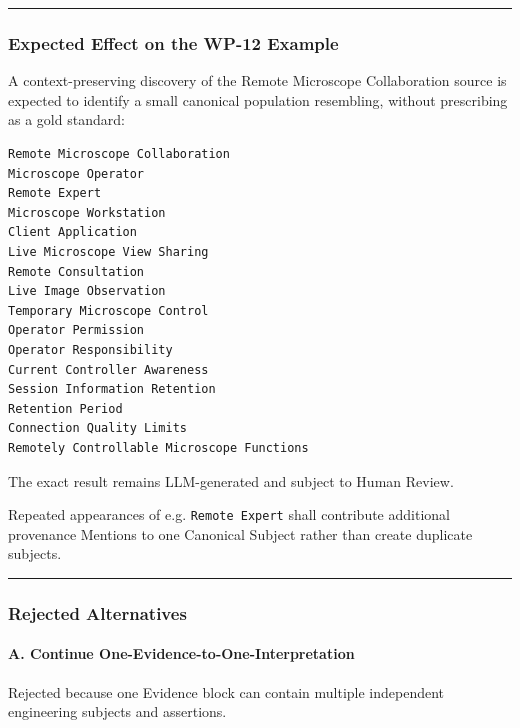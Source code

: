 \begin{center}\rule{0.5\linewidth}{0.5pt}\end{center}

\hypertarget{expected-effect-on-the-wp-12-example}{%
\subsubsection{Expected Effect on the WP-12 Example}\label{expected-effect-on-the-wp-12-example}}

A context-preserving discovery of the Remote Microscope Collaboration source is expected to identify a small canonical population resembling, without prescribing as a gold standard:

\begin{verbatim}
Remote Microscope Collaboration
Microscope Operator
Remote Expert
Microscope Workstation
Client Application
Live Microscope View Sharing
Remote Consultation
Live Image Observation
Temporary Microscope Control
Operator Permission
Operator Responsibility
Current Controller Awareness
Session Information Retention
Retention Period
Connection Quality Limits
Remotely Controllable Microscope Functions
\end{verbatim}

The exact result remains LLM-generated and subject to Human Review.

Repeated appearances of e.g. \texttt{Remote\ Expert} shall contribute additional provenance Mentions to one Canonical Subject rather than create duplicate subjects.

\begin{center}\rule{0.5\linewidth}{0.5pt}\end{center}

\hypertarget{rejected-alternatives-6}{%
\subsubsection{Rejected Alternatives}\label{rejected-alternatives-6}}

\hypertarget{a-continue-one-evidence-to-one-interpretation}{%
\paragraph{A. Continue One-Evidence-to-One-Interpretation}\label{a-continue-one-evidence-to-one-interpretation}}

Rejected because one Evidence block can contain multiple independent engineering subjects and assertions.

